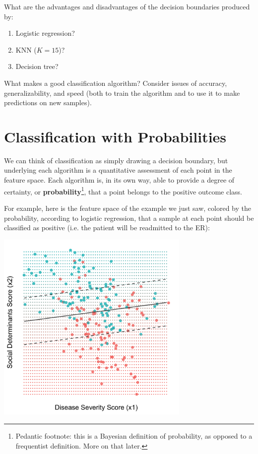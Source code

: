 \begin{question}{}
What are the advantages and disadvantages of the decision boundaries produced by:
  \begin{enumerate}
  \item Logistic regression?
  \item KNN ($K=15$)?
  \item Decision tree?
  \end{enumerate}
\end{question}

\begin{question}{}
What makes a good classification algorithm? Consider issues of accuracy, generalizability, and speed (both to train the algorithm and to use it to make predictions on new samples). 
\end{question}


\section{Classification with Probabilities}

We can think of classification as simply drawing a decision boundary, but underlying each algorithm is a quantitative assessment of each point in the feature space. Each algorithm is, in its own way, able to provide a degree of certainty, or \textbf{probability}\footnote{Pedantic footnote: this is a Bayesian definition of probability, as opposed to a frequentist definition. More on that later.}, that a point belongs to the positive outcome class. 

For example, here is the feature space of the example we just saw, colored by the probability, according to logistic regression, that a sample at each point should be classified as positive (i.e. the patient will be readmitted to the ER): 
\begin{center}
\includegraphics[width=0.7\textwidth]{img/esl-logistic-prob.png}
\end{center}

